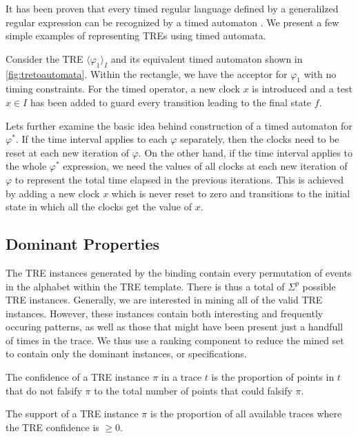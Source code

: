\documentclass[]{sigplanconf}
\begin{document}
It has been proven that every timed regular language  defined by a generalilzed regular expression can be recognized by a timed automaton \cite{timedregex}. We present a few simple examples of representing TREs using timed automata.

Consider the TRE $\langle \varphi_1  \rangle_I$ and its equivalent timed automaton shown in \ref{fig:tretoautomata}. Within the rectangle, we have the acceptor for $\varphi_1$ with no timing constraints. For the timed operator, a new clock $x$ is introduced and a test $x \in I$ has been added to guard every transition leading to the final state $f$.


Lets further examine the basic idea behind construction of a timed automaton for $\varphi^*$. If the time interval applies to each $\varphi$ separately, then the clocks need to be reset at each new iteration of $\varphi$. On the other hand, if the time interval applies to the whole $\varphi^*$ expression, we need the values of all clocks at each new iteration of $\varphi$ to represent the total time elapsed in the previous iterations. This is achieved by adding a new clock $x$ which is never reset to zero and transitions to the initial state in which all the clocks get the value of $x$.


\subsection{Dominant Properties}

The TRE instances generated by the binding contain every permutation of events in the alphabet within the TRE template. There is thus a total of $\Sigma^p$ possible TRE instances. Generally, we are interested in mining all of the valid TRE instances.
However, these instances contain both interesting and frequently occuring patterns, as well as those that might have been present just a handfull of times in the trace. We thus use a ranking component to reduce the mined set to contain only the dominant instances, or specifications.


\begin{defns}[Confidence]
The confidence of a TRE instance $\pi$ in a trace $t$ is the proportion of points in $t$ that do not falsify $\pi$ to the total number of points that could falsify $\pi$.
\end{defns}

\begin{defns}[Support]
The support of a TRE instance $\pi$ is the proportion of all available traces where the TRE confidence is $\ge 0$.
\end{defns}
\end{document}

